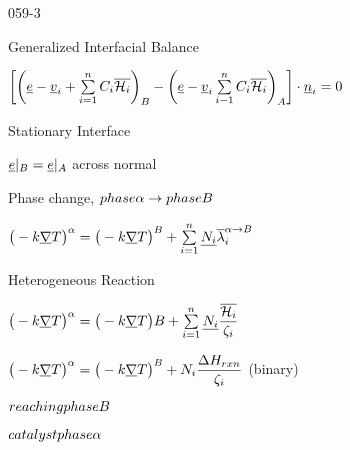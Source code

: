 \begin{mitframe}{059-3}
 \begin{listone}
\item Generalized Interfacial Balance
			\begin{listtwo}
            	\item $\bigg[\bigg(\mcef-\uline{\vvel}_{\state}+\sum\limits_{\state=1}^{n}\conc_{\state}\overline{\henry}\bigg)_{\exergy}-\bigg(\mcef-\uline{\vvel}_{\state}\sum\limits_{\state-1}^{n}\conc_{\state}\overline{\henry}\bigg)_{\helmholtz}\bigg]\cdot\normvec_{\state}=0$
                
                
              \end{listtwo}
\item Stationary Interface
			\begin{listtwo}
            		\item $\mcef|_{\exergy}=\mcef|_{\helmholtz}$ across normal
                    \item Phase change, $phase \tdiff\rightarrow phase\exergy$
                    	\begin{listthree}
                        		\item $\big(-\thermcond\gradop\Temp\big)^{\tdiff}=\big(-\thermcond\gradop\Temp\big)^{\exergy}+\sum\limits_{\state=1}^n\uline{\massspecflux{i}}\overline{\wavel}_{\state}^{\tdiff\rightarrow\exergy}$
                        \end{listthree}
                   \item Heterogeneous Reaction
                   		\begin{listthree}
                        \item $\big(-\thermcond\gradop\Temp\big)^{\tdiff}=\big(-\thermcond\gradop\Temp\big){\exergy}+\sum\limits_{\state=1}^{n}\uline{\massspecflux{i}}\dfrac{\overline{\henry}}{\zeta_{\state}}$
                        \item $\big(-\thermcond\gradop\Temp\big)^{\tdiff}=\big(-\thermcond\gradop\Temp\big)^{\exergy}+\massspecflux{i}\dfrac{\iipf\enthalpy_{\pos\disp{n}}}{\zeta_{\state}}$ (binary)
                        \begin{listfour}
                        	\item $ reaching phase \exergy$
                            \item $catalyst  phase  \tdiff$
                            
                        \end{listfour}
                     \end{listthree}
            \end{listtwo}
\end{listone}
\end{mitframe}